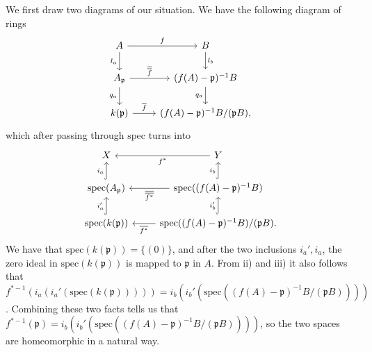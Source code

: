 \documentclass{article}
\theoremstyle{definition}
\newcommand{\spec}{\text{spec}}
\begin{document}
We first draw two diagrams of our situation. We
have the following diagram of rings
\[ 
	\begin{tikzcd}
		A \arrow{r}{f} \arrow[swap]{d}{l_a} & 
		B \arrow{d}{l_b} \\
		A_{\mathfrak{p}} \arrow{r}{\overline{\overline{f}}} \arrow[swap]{d}{q_a} &
		(f(A) - \mathfrak{p})^{-1} B \arrow[swap]{d}{q_a} \\
		k(\mathfrak{p}) \arrow{r}{\overline{f}} &
		(f(A) - \mathfrak{p})^{-1} B / (\mathfrak{p}B),
	\end{tikzcd}
\]
which after passing through $\spec$ turns into
\[ 
	\begin{tikzcd}
		X & 
		Y 
			\arrow{l}{f^{*}} \\
		\spec(A_{\mathfrak{p}}) \arrow[hookrightarrow, u, "i_a"] &
		\spec((f(A) - \mathfrak{p})^{-1} B) 
			\arrow[hookrightarrow, u, "i_b"] 
			\arrow{l}{\overline{\overline{f^{*}}}} \\
		\spec(k(\mathfrak{p})) 
			\arrow[hookrightarrow, u, "i_a'"] &
		\spec((f(A) - \mathfrak{p})^{-1} B)/(\mathfrak{p}B) 
			\arrow[hookrightarrow, u, "i_b'"] 
			\arrow{l}{\overline{f^{*}}}.
	\end{tikzcd}
\]
We have that $\spec(k(\mathfrak{p})) = \{(0)\}$, and after the two inclusions $i_a', i_a$, the
zero ideal in $\spec(k(\mathfrak{p}))$ is mapped to  $\mathfrak{p}$ in $A$. From ii) and iii) it
also follows that $f^{*-1}(i_a(i_a'(\spec(k(\mathfrak{p}))))) =
i_b(i_b'(\spec((f(A) - \mathfrak{p})^{-1} B/(\mathfrak{p}B))))$. Combining these two facts tells 
us that $f^{*-1}(\mathfrak{p}) = i_b(i_b'(\spec((f(A) - \mathfrak{p})^{-1}
B/(\mathfrak{p}B))))$, so the two spaces are homeomorphic in a natural way. \\
\end{document}

